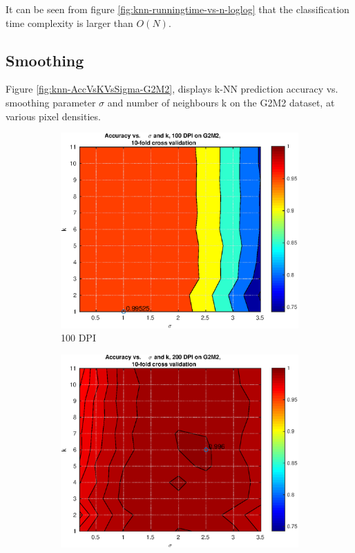 It can be seen from figure \ref{fig:knn-runningtime-vs-n-loglog} that
the classification time complexity is larger than \(O(N)\).

\subsection{Smoothing}
Figure \ref{fig:knn-AccVsKVsSigma-G2M2},
displays k-NN prediction accuracy vs. smoothing parameter \(\sigma\)
and number of neighbours k on the G2M2 dataset, at various pixel densities.

\begin{figure}[h]
	\centering
	\begin{subfigure}{0.32\textwidth}
		\includegraphics[width = \textwidth]{img/knn-AccVsKVsSigma-G2M2-dpi100-cv10}
		\caption{100 DPI}
	\end{subfigure}
	\begin{subfigure}{0.32\textwidth}
		\includegraphics[width = \textwidth]{img/knn-AccVsKVsSigma-G2M2-dpi200-cv10}

\end{subfigure}
\end{figure}
